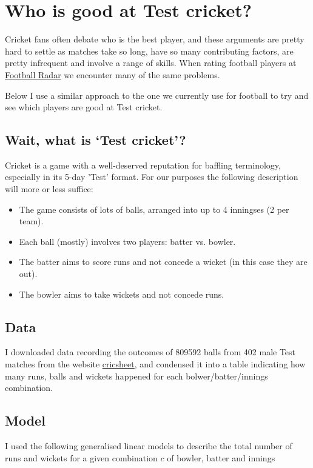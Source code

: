 \documentclass[11pt]{article}
\date{}
\title{}
\begin{document}
\section*{Who is good at Test cricket?}
\label{sec:org46c8787}
Cricket fans often debate who is the best player, and these arguments
are pretty hard to settle as matches take so long, have so many
contributing factors, are pretty infrequent and involve a range of
skills. When rating football players at \href{http:www.footballradar.com}{Football Radar} we encounter
many of the same problems.

Below I use a similar approach to the one we currently use for
football to try and see which players are good at Test cricket.

\subsection*{Wait, what is `Test cricket'?}
\label{sec:org8bcd398}
Cricket is a game with a well-deserved reputation for baffling
terminology, especially in its 5-day 'Test' format. For our purposes
the following description will more or less suffice:

\begin{itemize}
\item The game consists of lots of balls, arranged into up to 4 inningses
(2 per team).
\item Each ball (mostly) involves two players: batter vs. bowler.
\item The batter aims to score runs and not concede a wicket (in this case
they are out).
\item The bowler aims to take wickets and not concede runs.
\end{itemize}

\subsection*{Data}
\label{sec:org17c6ed0}
I downloaded data recording the outcomes of 809592 balls from 402 male Test
matches from the website \href{https://cricsheet.org/downloads/\#experimental}{cricsheet}, and condensed it into a table indicating how
many runs, balls and wickets happened for each bolwer/batter/innings
combination.

\subsection*{Model}
\label{sec:orga7eba4f}
I used the following generalised linear models to describe the total number of
runs and wickets for a given combination \(c\) of bowler, batter and innings
\end{document}
